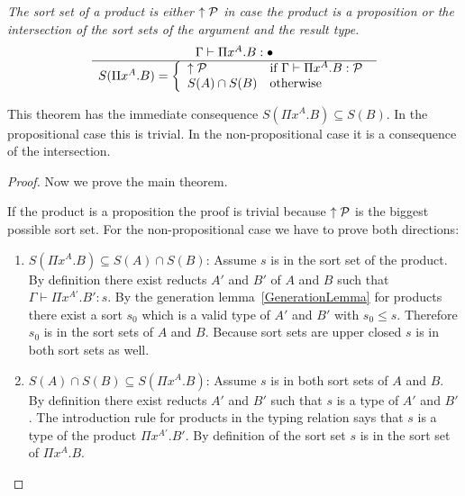 \begin{theorem}
    \label{thm:SortSetProduct}
    \emph{The sort set of a product is either ${\uparrow {\cal P}}$ in case the product
    is a proposition or the intersection of the sort sets of the argument and
    the result type.}
    $$
    \ruleh{
        \Gamma \vdash \Pi x^A. B : \dontcare
    }
    {
        S(\Pi x^A. B) =
        \dcases{
            \upper\Prop & \text{if }\Gamma \vdash \Pi x^A . B : \Prop
            \\
            S(A) \cap S(B) & \text{otherwise}
        }
    }
    $$

    This theorem has the immediate consequence $S(\Pi x^A. B) \subseteq S(B)$. In
    the propositional case this is trivial. In the non-propositional case it is
    a consequence of the intersection.

    \begin{proof}
        Now we prove the main theorem.

        If the product is a proposition the proof is trivial because
        ${\uparrow {\cal P}}$ is the biggest possible sort set. For the
        non-propositional case we have to prove both directions:
        \begin{enumerate}
            \item $S(\Pi x^A. B) \subseteq S(A) \cap S(B)$:
                Assume $s$ is in the sort set of the product. By definition
                there exist reducts $A'$ and $B'$ of $A$ and $B$ such that
                $\Gamma \vdash \Pi x^{A'}. B' : s$. By the generation
                lemma~\ref{GenerationLemma} for products there exist a sort
                $s_0$ which is a valid type of $A'$ and $B'$ with $s_0 \le s$.
                Therefore $s_0$ is in the sort sets of $A$ and $B$. Because sort
                sets are upper closed $s$ is in both sort sets as well.

            \item $S(A) \cap S(B) \subseteq S(\Pi x^A. B)$:
                Assume $s$ is in both sort sets of $A$ and $B$. By definition
                there exist reducts $A'$ and $B'$ such that $s$ is a type of
                $A'$ and $B'$. The introduction rule for products in the typing
                relation says that $s$ is a type of the product $\Pi x^{A'}.
                B'$. By definition of the sort set $s$ is in the sort set of
                $\Pi x^A. B$.
        \end{enumerate}
    \end{proof}
\end{theorem}






